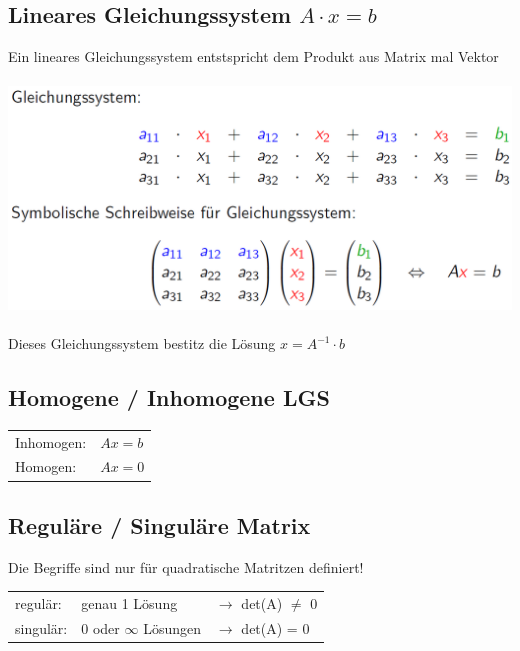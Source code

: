 			\subsection{Lineares Gleichungssystem $A \cdot x = b$}	
			Ein lineares Gleichungssystem entstspricht dem Produkt aus Matrix mal Vektor \\
			\\
			\includegraphics[width=0.8\linewidth]{Bilder/Ax_b} \\
			\\
			Dieses Gleichungssystem bestitz die Lösung $x = A^{-1} \cdot b$ \\	
				    
		    
		    
		    \subsection{Homogene / Inhomogene LGS}
		    \begin{tabular}{ll}
		    Inhomogen: & $Ax = b$ \\
		    Homogen: & $Ax = 0$ \\
		    \end{tabular}
		    
		    
		    
		    \subsection{Reguläre / Singuläre Matrix}
		    Die Begriffe sind nur für quadratische Matritzen definiert! \\
		    \begin{tabular}{lll}
		    regulär: & genau 1 Lösung & $\rightarrow$ det(A) $\neq$ 0 \\
		    singulär: & 0 oder $\infty$ Lösungen & $\rightarrow$ det(A) = 0 \\
		    \end{tabular}
		    